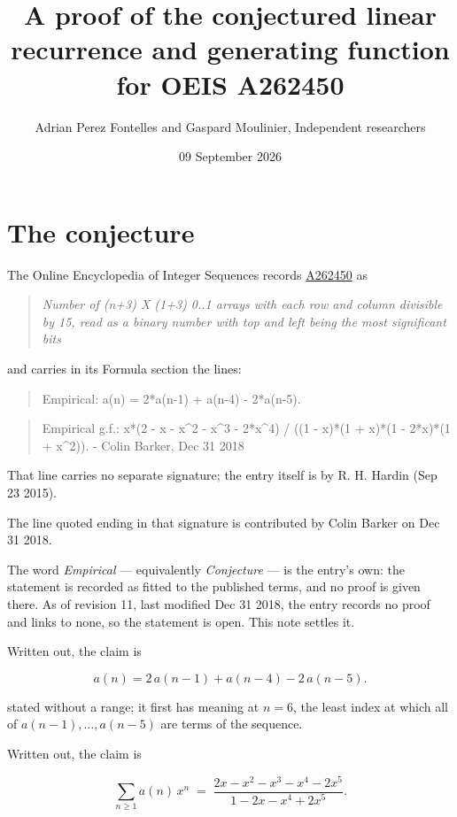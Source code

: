 \documentclass[11pt]{article}
\title{A proof of the conjectured linear recurrence and generating function for OEIS A262450}
\author{Adrian Perez Fontelles and Gaspard Moulinier, Independent researchers}
\date{09 September 2026}
\theoremstyle{definition}
\begin{document}
\maketitle
\section{The conjecture}

The Online Encyclopedia of Integer Sequences records \href{https://oeis.org/A262450}{A262450} as

\begin{quote}\itshape Number of (n+3) X (1+3) 0..1 arrays with each row and column divisible by 15, read as a binary number with top and left being the most significant bits\end{quote}

and carries in its Formula section the lines:

\begin{quote}\ttfamily Empirical: a(n) = 2*a(n-1) + a(n-4) - 2*a(n-5).\end{quote}

\begin{quote}\ttfamily Empirical g.f.: x*(2 - x - x\textasciicircum{}2 - x\textasciicircum{}3 - 2*x\textasciicircum{}4) / ((1 - x)*(1 + x)*(1 - 2*x)*(1 + x\textasciicircum{}2)). - Colin Barker, Dec 31 2018\end{quote}

That line carries no separate signature; the entry itself is by R. H. Hardin (Sep 23 2015).

The line quoted ending in that signature is contributed by Colin Barker on Dec 31 2018.

The word {\itshape Empirical} --- equivalently {\itshape Conjecture} --- is the entry's own: the statement is recorded as fitted to the published terms, and no proof is given there. As of revision 11, last modified Dec 31 2018, the entry records no proof and links to none, so the statement is open. This note settles it.

Written out, the claim is

\[a(n) = 2\,a(n-1) + a(n-4) - 2\,a(n-5).\]

stated without a range; it first has meaning at $n = 6$, the least index at which all of $a(n-1),\dots,a(n-5)$ are terms of the sequence.

Written out, the claim is

\[\sum_{n \ge 1} a(n)\,x^n \;=\; \frac{2x - x^{2} - x^{3} - x^{4} - 2x^{5}}{1 - 2x - x^{4} + 2x^{5}}.\]
\end{document}
